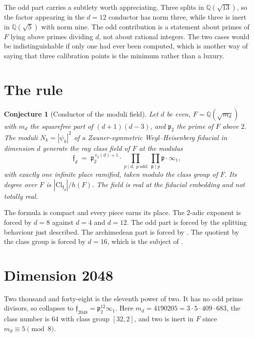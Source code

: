 \documentclass[12pt,a4paper]{article}
\newtheorem{conjecture}[theorem]{Conjecture}
\newcommand{\Fd}{F}
\newcommand{\md}{m_d}
\newcommand{\pt}{\mathfrak{p}_2}
\newcommand{\Cl}{\mathrm{Cl}}
\begin{document}
The odd part carries a subtlety worth appreciating. Three splits in
$\mathbb{Q}(\sqrt{13})$, so the factor appearing in the $d=12$ conductor has
norm three, while three is inert in $\mathbb{Q}(\sqrt5)$ with norm nine. The odd
contribution is a statement about primes of $\Fd$ lying above primes dividing
$d$, not about rational integers. The two cases would be indistinguishable if
only one had ever been computed, which is another way of saying that three
calibration points is the minimum rather than a luxury.

\section{The rule}
\label{sec:rule}

\begin{conjecture}[Conductor of the moduli field]
\label{conj:rule}
Let $d$ be even, $\Fd = \mathbb{Q}(\sqrt{\md})$ with $\md$ the squarefree part
of $(d+1)(d-3)$, and $\pt$ the prime of $\Fd$ above $2$. The moduli
$N_k = |\psi_k|^2$ of a Zauner-symmetric Weyl--Heisenberg fiducial in dimension
$d$ generate the ray class field of $\Fd$ at the modulus
\[
\mathfrak{f}_d \;=\; \pt^{\,v_2(d)+1}\cdot \prod_{p\mid d,\ p\ \mathrm{odd}}\
\prod_{\mathfrak{p}\mid p}\mathfrak{p}\cdot\infty_1,
\]
with exactly one infinite place ramified, taken modulo the class group of $\Fd$.
Its degree over $\Fd$ is $|\Cl_{\mathfrak{f}_d}|/h(\Fd)$. The field is real at
the fiducial embedding and not totally real.
\end{conjecture}

The formula is compact and every piece earns its place. The $2$-adic exponent is
forced by $d=8$ against $d=4$ and $d=12$. The odd part is forced by the splitting
behaviour just described. The archimedean part is forced by
. The quotient by the class group is forced by $d=16$, which is
the subject of \Cref{sec:classgroup}.

\section{Dimension 2048}
\label{sec:d2048}

Two thousand and forty-eight is the eleventh power of two. It has no odd prime
divisors, so \Cref{conj:rule} collapses to $\mathfrak{f}_{2048} = \pt^{12}\infty_1$.
Here $\md = 4190205 = 3\cdot 5\cdot 409\cdot 683$, the class number is $64$ with
class group $[32,2]$, and two is inert in $\Fd$ since $\md \equiv 5 \pmod 8$.
\end{document}
